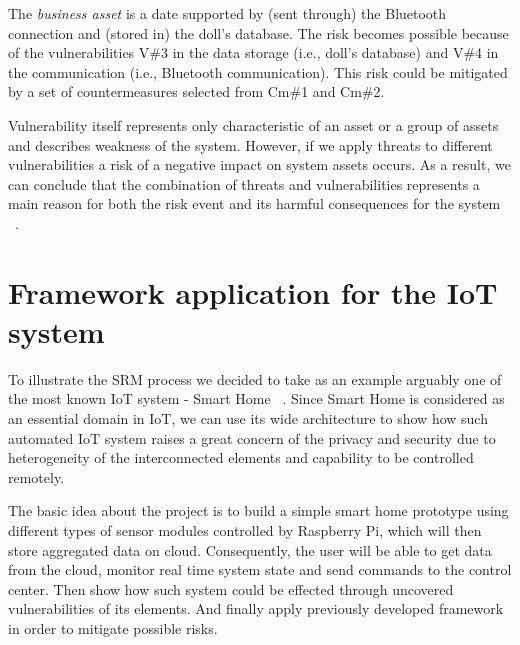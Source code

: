 \documentclass[12pt]{article}
\begin{document}
	The \textit{business asset} is a date supported by (sent through) the Bluetooth connection and (stored in) the doll’s database. The risk becomes possible because of the vulnerabilities V\#3 in the data storage (i.e., doll’s database) and V\#4 in the communication (i.e., Bluetooth communication). This risk could be mitigated by a set of countermeasures selected from Cm\#1 and Cm\#2.

\vspace*{1ex}
Vulnerability itself represents only characteristic of an asset or a group of assets and describes weakness of the system. However, if we apply threats to different vulnerabilities  a risk of a negative impact on system assets occurs. As a result, we can conclude that the combination of threats and vulnerabilities represents a main reason for both the risk event and its harmful consequences for the system ~\cite{FSSM}.


\newpage
\section{Framework application for the IoT system}
To illustrate the SRM process we decided to take as an example arguably one of the most known IoT system - Smart Home ~\cite{SH}. Since Smart Home is considered as an essential domain in IoT, we can use its wide architecture to show how such automated IoT system raises a great concern of the privacy and security due to heterogeneity of the interconnected elements and capability to be controlled remotely.

The basic idea about the project is to build a simple smart home prototype using different types of sensor modules controlled by Raspberry Pi, which will then store aggregated data on cloud. Consequently, the user will be able to get data from the cloud, monitor real time system state and send commands to the control center. Then show how such system could be effected through uncovered vulnerabilities of its elements. And finally apply previously developed framework in order to mitigate possible risks.  
\end{document}
